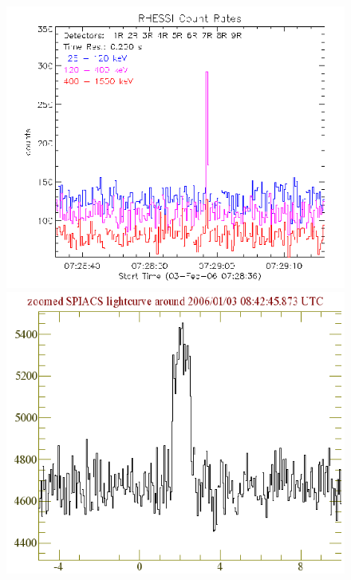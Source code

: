 \begin{figure}[ht!]
\begin{minipage}[b]{0.5\linewidth}
\centering
\includegraphics[scale=0.46]{Images/ipn_light_curve.png}
\end{minipage}
\hspace{0.5cm}
\begin{minipage}[b]{0.5\linewidth}
\centering
\includegraphics[scale=0.35]{Images/060103_flattop.png}
\end{minipage}

\end{figure}
